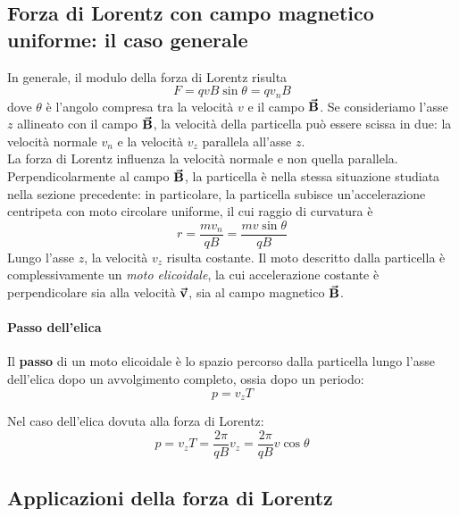 \subsection{Forza di Lorentz con campo magnetico uniforme: il caso generale}
In generale, il modulo della forza di Lorentz risulta
\begin{equation*}
	F=qvB\sin\theta=q v_n B
\end{equation*}
dove $\theta$ è l'angolo compresa tra la velocità $v$ e il campo $\vb*{\va{B}}$. Se consideriamo l'asse $z$ allineato con il campo $\vb*{\va{B}}$, la velocità della particella può essere scissa in due: la velocità normale $v_n$ e la velocità $v_z$ parallela all'asse $z$.\\
La forza di Lorentz influenza la velocità normale e non quella parallela. Perpendicolarmente al campo $\vb*{\va{B}}$, la particella è nella stessa situazione studiata nella sezione precedente: in particolare, la particella subisce un'accelerazione centripeta con moto circolare uniforme, il cui raggio di curvatura è
\begin{equation}
	r=\frac{mv_n}{qB}=\frac{mv\sin\theta}{qB}
\end{equation}
Lungo l'asse $z$, la velocità $v_z$ risulta costante. Il moto descritto dalla particella è complessivamente un \textit{moto elicoidale}, la cui accelerazione costante è perpendicolare sia alla velocità $\vb*{\va{v}}$, sia al campo magnetico $\vb*{\va{B}}$.\\
\paragraph{Passo dell'elica}
\begin{define}
	Il \textbf{passo} di un moto elicoidale  è lo spazio percorso dalla particella lungo l'asse dell'elica dopo un avvolgimento completo, ossia dopo un periodo:
	\begin{equation}
		p=v_zT
	\end{equation}
\end{define}
Nel caso dell'elica dovuta alla forza di Lorentz:
\begin{equation}
	p=v_zT=\frac{2\pi}{qB}v_z=\frac{2\pi}{qB}v\cos\theta
\end{equation}
\subsection{Applicazioni della forza di Lorentz}
